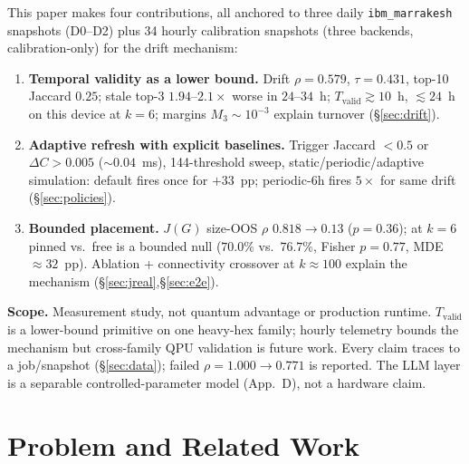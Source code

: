 \documentclass[journal,10pt,twocolumn]{IEEEtran}
\begin{document}
This paper makes four contributions, all anchored to three daily \texttt{ibm\_marrakesh} snapshots
(D0--D2) plus 34 hourly calibration snapshots (three backends, calibration-only) for the drift mechanism:
\begin{enumerate}[leftmargin=1.8em,itemsep=1pt,topsep=2pt]
\item \textbf{Temporal validity as a lower bound.} Drift $\rho{=}0.579$, $\tau{=}0.431$, top-10 Jaccard
$0.25$; stale top-3 $1.94$--$2.1\times$ worse in $24$--$34$~h; $T_{\mathrm{valid}}\gtrsim10$~h,
$\lesssim24$~h on this device at $k{=}6$; margins $M_3\sim10^{-3}$ explain turnover
(\S\ref{sec:drift}).
\item \textbf{Adaptive refresh with explicit baselines.} Trigger Jaccard $<0.5$ or $\Delta C{>}0.005$
($\sim0.04$~ms), 144-threshold sweep, static/periodic/adaptive simulation: default fires once for
$+33$~pp; periodic-$6$h fires $5\times$ for same drift (\S\ref{sec:policies}).
\item \textbf{Bounded placement.} $J(G)$ size-OOS $\rho$ $0.818{\to}0.13$ ($p{=}0.36$); at $k{=}6$ pinned vs.\
free is a bounded null ($70.0\%$ vs.\ $76.7\%$, Fisher $p{=}0.77$, MDE $\approx32$~pp). Ablation +
connectivity crossover at $k\approx100$ explain the mechanism (\S\ref{sec:jreal},\S\ref{sec:e2e}).
\end{enumerate}

\noindent\textbf{Scope.} Measurement study, not quantum advantage or production runtime. $T_{\mathrm{valid}}$ is a
lower-bound primitive on one heavy-hex family; hourly telemetry bounds the mechanism but cross-family QPU
validation is future work. Every claim traces to a job/snapshot (\S\ref{sec:data}); failed $\rho{=}1.000\to0.771$
is reported. The LLM layer is a separable controlled-parameter model (App.~D), not a hardware claim.

\section{Problem and Related Work}
\end{document}
